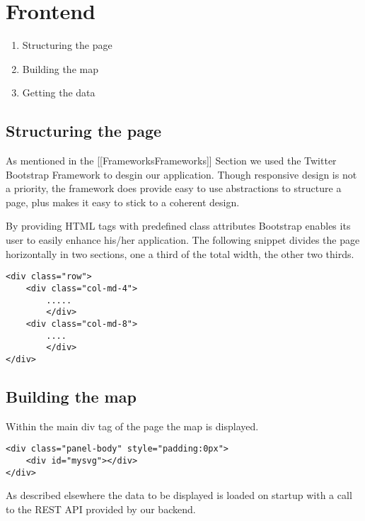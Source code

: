 
\section{Frontend}

\begin{enumerate}
\def\labelenumi{\arabic{enumi}.}
\itemsep1pt\parskip0pt
\item
  Structuring the page
\item
  Building the map
\item
  Getting the data
\end{enumerate}

\subsection{Structuring the page}\label{structuring-the-page}

As mentioned in the {[}{[}Frameworks\textbar{}Frameworks{]}{]} Section
we used the Twitter Bootstrap Framework to desgin our application.
Though responsive design is not a priority, the framework does provide
easy to use abstractions to structure a page, plus makes it easy to
stick to a coherent design.

By providing HTML tags with predefined class attributes Bootstrap
enables its user to easily enhance his/her application. The following
snippet divides the page horizontally in two sections, one a third of
the total width, the other two thirds.


\begin{lstlisting}
<div class="row">
	<div class="col-md-4">
        .....
        </div>
	<div class="col-md-8">
        ....
        </div>
</div>
\end{lstlisting}



\subsection{Building the map}\label{building-the-map}

Within the main div tag of the page the map is displayed.



\begin{lstlisting}
<div class="panel-body" style="padding:0px">
    <div id="mysvg"></div>
</div>
\end{lstlisting}


As described elsewhere the data to be displayed is loaded on startup
with a call to the REST API provided by our backend.

